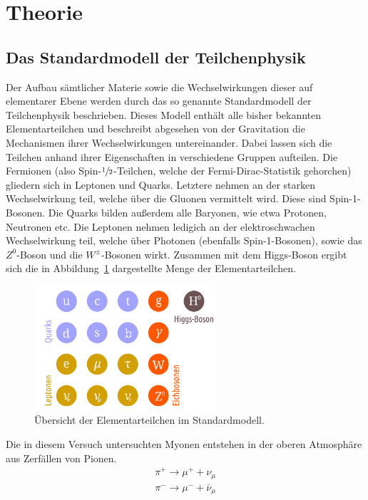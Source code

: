 \section{Theorie}
\label{sec:theorie}

\subsection{Das Standardmodell der Teilchenphysik}

Der Aufbau sämtlicher Materie sowie die Wechselwirkungen dieser auf elementarer Ebene werden durch das so
genannte Standardmodell der Teilchenphysik beschrieben. Dieses Modell enthält alle bisher bekannten
Elementarteilchen und beschreibt abgesehen von der Gravitation die Mechanismen ihrer Wechselwirkungen
untereinander. Dabei lassen sich die Teilchen anhand ihrer Eigenschaften in verschiedene Gruppen aufteilen.
Die Fermionen (also Spin-$\sfrac{1}{2}$-Teilchen, welche der Fermi-Dirac-Statistik gehorchen) gliedern sich in
Leptonen und Quarks. Letztere nehmen an der starken Wechselwirkung teil, welche über die Gluonen vermittelt wird.
Diese sind Spin-1-Bosonen. Die Quarks bilden außerdem alle Baryonen, wie etwa Protonen, Neutronen etc. Die
Leptonen nehmen ledigich an der elektroschwachen Wechselwirkung teil, welche über Photonen (ebenfalls
Spin-1-Bosonen), sowie das $Z^0$-Boson und die $W^{\pm}$-Bosonen wirkt. Zusammen mit dem Higgs-Boson ergibt sich die
in Abbildung~\ref{fig:sm} dargestellte Menge der Elementarteilchen.
%
\begin{figure}[htb]
  \centering
  \includegraphics[width=0.6\textwidth]{figures/standardmodell.png}
  \caption{Übersicht der Elementarteilchen im Standardmodell.}
  \label{fig:sm}
\end{figure}
%
Die in diesem Versuch untersuchten Myonen entstehen in der oberen Atmosphäre aus Zerfällen von Pionen.
%
\begin{align}
  \pi^+\rightarrow\mu^++\nu_\mu \\
  \pi^-\rightarrow\mu^-+\bar{\nu}_\mu
\end{align}
